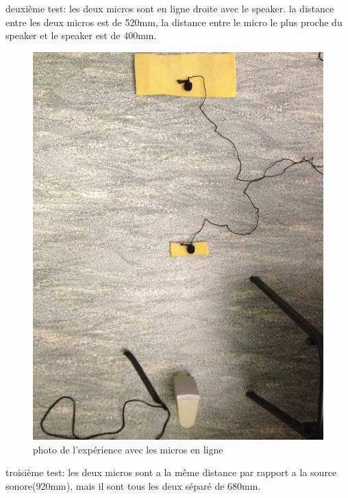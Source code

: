 \documentclass[12pt,a4paper]{article}
\begin{document}
	deuxième test:
		les deux micros sont en ligne droite avec le speaker. la distance entre les deux micros est de 520mm, la distance entre le micro le plus proche du speaker et le speaker est de 400mm.
\begin{figure}[H]
		\includegraphics[width=\textwidth]{../donnees11-03/test_2.jpg} 
		\caption{photo de l'expérience avec les micros en ligne}
\end{figure}
	troisième test:
		les deux micros sont a la même distance par rapport a la source sonore(920mm), mais il sont tous les deux séparé de 680mm.
\end{document}
